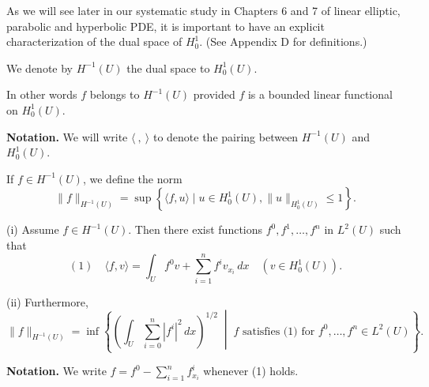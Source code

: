 As we will see later in our systematic study in Chapters 6 and 7 of linear elliptic, parabolic and hyperbolic PDE, it is important to have an explicit characterization of the dual space of $H_0^1$. (See Appendix D for definitions.)

\begin{definition}
\label{def:dual-space-h-minus-1}
We denote by $H^{-1}(U)$ the dual space to $H_0^1(U)$.
\end{definition}

In other words $f$ belongs to $H^{-1}(U)$ provided $f$ is a bounded linear functional on $H_0^1(U)$.

\textbf{Notation.} We will write $\langle\ ,\ \rangle$ to denote the pairing between $H^{-1}(U)$ and $H_0^1(U)$.

\begin{definition}[Norm on $H^{-1}(U)$]
\label{def:norm-on-h-minus-1}
If $f \in H^{-1}(U)$, we define the norm
$$\|f\|_{H^{-1}(U)} = \sup\left\{\langle f,u\rangle \mid u \in H_0^1(U), \|u\|_{H_0^1(U)} \le 1\right\}.$$
\end{definition}

\begin{theorem}[Characterization of $H^{-1}$]
\label{thm:characterization-h-minus-1}
(i) Assume $f \in H^{-1}(U)$. Then there exist functions $f^0, f^1, \ldots, f^n$ in $L^2(U)$ such that
$$(1) \quad \langle f,v \rangle = \int_U f^0 v + \sum_{i=1}^n f^i v_{x_i}\,dx \quad (v \in H_0^1(U)).$$

(ii) Furthermore,
$$\|f\|_{H^{-1}(U)} = \inf\left\{\left(\int_U \sum_{i=0}^n |f^i|^2\,dx\right)^{1/2} \;\middle|\; f \text{ satisfies (1) for } f^0,\ldots,f^n \in L^2(U)\right\}.$$
\end{theorem}

\textbf{Notation.} We write $f = f^0 - \sum_{i=1}^n f_{x_i}^i$ whenever (1) holds.

